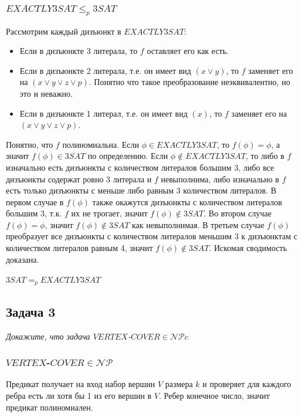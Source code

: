 \documentclass{article}
\begin{document}
\subsubsection*{$EXACTLY3SAT \leq_p 3SAT$}
Рассмотрим каждый дизъюнкт в $EXACTLY3SAT$:
\begin{itemize}
	\item Если в дизъюнкте 3 литерала, то $f$ оставляет его как есть.
	\item Если в дизъюнкте 2 литерала, т.е. он имеет вид $(x \vee y)$, то  $f$ заменяет его на $(x \vee y \vee z \vee p)$. Понятно что такое преобразование неэквивалентно, но это и неважно.
	\item Если в дизъюнкте 1 литерал, т.е. он имеет вид $(x)$, то $f$ заменяет его на $(x \vee y \vee z \vee p)$.
\end{itemize}
Понятно, что $f$ полиномиальна. Если $\phi \in EXACTLY3SAT$, то $f(\phi) = \phi$, а значит $f(\phi) \in 3SAT$ по определению. Если $\phi \notin EXACTLY3SAT$, то либо в $f$ изначально есть дизъюнкты с количеством литералов большим 3, либо все дизъюнкты содержат ровно 3 литерала и $f$ невыполнима, либо изначально в $f$ есть только дизъюнкты с меньше либо равным 3 количеством литералов. В первом случае в $f(\phi)$ также окажутся дизъюнкты с количеством литералов большим 3, т.к. $f$ их не трогает, значит $f(\phi) \notin 3SAT$. Во втором случае $f(\phi) = \phi$, значит $f(\phi) \notin 3SAT$ как невыполнимая. В третьем случае $f(\phi)$ преобразует все дизъюнкты с количеством литералов меньшим 3 к дизъюнктам с количеством литералов равным 4, значит $f(\phi) \notin 3SAT$. Искомая сводимость доказана.\\
\\
$3SAT =_p EXACTLY3SAT$
\subsection*{Задача 3}
\textit{Докажите, что задача $VERTEX$-$COVER \in \mathcal{NP}c$}
\subsubsection*{$VERTEX$-$COVER \in \mathcal{NP}$}
Предикат получает на вход набор вершин $V$ размера $k$ и проверяет для каждого ребра есть ли хотя бы 1 из его вершин в $V$. Ребер конечное число, значит предикат полиномиален.
\end{document}

